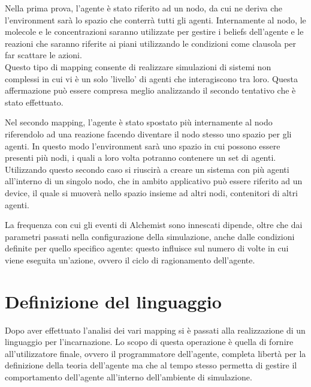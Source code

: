 \documentclass[12pt,a4paper,openright,twoside]{report}
\begin{document}
Nella prima prova, l'agente \`e stato riferito ad un nodo, da cui ne deriva che l'environment sar\`a lo spazio che conterr\`a tutti gli agenti. Internamente al nodo, le molecole e le concentrazioni saranno utilizzate per gestire i beliefs dell'agente e le reazioni che saranno riferite ai piani utilizzando le condizioni come clausola per far scattare le azioni.
\\
Questo tipo di mapping consente di realizzare simulazioni di sistemi non complessi in cui vi \`e un solo 'livello' di agenti che interagiscono tra loro. Questa affermazione pu\`o essere compresa meglio analizzando il secondo tentativo che \`e stato effettuato.

Nel secondo mapping, l'agente \`e stato spostato pi\`u internamente al nodo riferendolo ad una reazione facendo diventare il nodo stesso uno spazio per gli agenti. In questo modo l'environment sar\`a uno spazio in cui possono essere presenti pi\`u nodi, i quali a loro volta potranno contenere un set di agenti.
\\
Utilizzando questo secondo caso si riuscir\`a a creare un sistema con pi\`u agenti all'interno di un singolo nodo, che in ambito applicativo pu\`o essere riferito ad un device, il quale si muover\`a nello spazio insieme ad altri nodi, contenitori di altri agenti.

La frequenza con cui gli eventi di Alchemist sono innescati dipende, oltre che dai parametri passati nella configurazione della simulazione, anche dalle condizioni definite per quello specifico agente: questo influisce sul numero di volte in cui viene eseguita un'azione, ovvero il ciclo di ragionamento dell'agente.

\section{Definizione del linguaggio}\label{DefinizioneLinguaggio}
Dopo aver effettuato l'analisi dei vari mapping si \`e passati alla realizzazione di un linguaggio per l'incarnazione. Lo scopo di questa operazione \`e quella di fornire all'utilizzatore finale, ovvero il programmatore dell'agente, completa libert\`a per la definizione della teoria dell'agente ma che al tempo stesso permetta di gestire il comportamento dell'agente all'interno dell'ambiente di simulazione.
\end{document}
